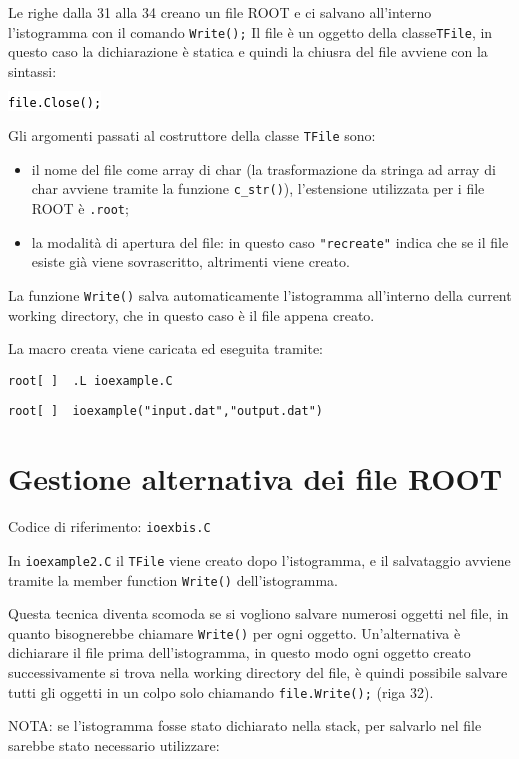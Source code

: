 \documentclass{article}
\newcommand{\ttt}{\texttt}
\newcommand{\tcpp}[1]{\hspace{10pt}\colorbox{background}{\textcolor{black}{\texttt{#1}}}}
\newcommand{\troot}[1]{\hspace{10pt}\colorbox{bashbackground}{\textcolor{bashtext}{\texttt{root[~]~~#1}}}}
\begin{document}
Le righe dalla 31 alla 34 creano un file ROOT e ci salvano all'interno l'istogramma con il comando \ttt{Write();}
Il file è un oggetto della classe\ttt{TFile}, in questo caso la dichiarazione è statica e quindi la chiusra del file avviene con la sintassi:

\tcpp{file.Close();}

Gli argomenti passati al costruttore della classe \ttt{TFile} sono:
\begin{itemize}
    \item il nome del file come array di char (la trasformazione da stringa ad array di char avviene tramite la funzione \ttt{c\_str()}), l'estensione utilizzata per i file ROOT è \ttt{.root};
    \item la modalità di apertura del file: in questo caso \ttt{"recreate"} indica che se il file esiste già viene sovrascritto, altrimenti viene creato.
\end{itemize}

La funzione \ttt{Write()} salva automaticamente l'istogramma all'interno della current working directory, che in questo caso è il file appena creato.


La macro creata viene caricata ed eseguita tramite:

\vspace{5pt}

\troot{.L ioexample.C}

\troot{ioexample("input.dat","output.dat")}
\vspace{5pt}


\section{Gestione alternativa dei file ROOT}
Codice di riferimento: \ttt{ioexbis.C} \vspace{10pt}

In \ttt{ioexample2.C} il \ttt{TFile} viene creato dopo l'istogramma, e il salvataggio avviene tramite la member function \ttt{Write()} dell'istogramma.

Questa tecnica diventa scomoda se si vogliono salvare numerosi oggetti nel file, in quanto bisognerebbe chiamare \ttt{Write()} per ogni oggetto.
Un'alternativa è dichiarare il file prima dell'istogramma, in questo modo ogni oggetto creato successivamente si trova nella working directory del file,
è quindi possibile salvare tutti gli oggetti in un colpo solo chiamando \ttt{file.Write();} (riga 32).

NOTA: se l'istogramma fosse stato dichiarato nella stack, per salvarlo nel file sarebbe stato necessario utilizzare:
\end{document}
